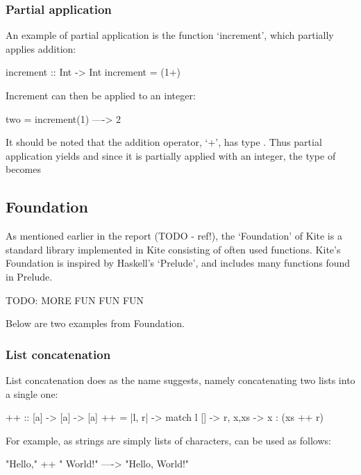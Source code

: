 \subsubsection{Partial application}

An example of partial application is the function `increment', which partially applies addition:

\begin{kite}

increment :: Int -> Int
increment = (1+)

\end{kite}

Increment can then be applied to an integer:

\begin{kite}
  
  two = increment(1) ----> 2
\end{kite}


It should be noted that the addition operator, `+', has type . Thus partial application yields  and since it is partially applied with an integer, the type of  becomes 

\subsection{Foundation}

As mentioned earlier in the report (TODO - ref!), the `Foundation' of Kite is a standard library implemented in Kite consisting of often used functions. Kite's Foundation is inspired by Haskell's `Prelude', and includes many functions found in
Prelude. 

TODO: MORE FUN FUN FUN

Below are two examples from Foundation.
\subsubsection{List concatenation}

List concatenation does as the name suggests, namely concatenating two lists into a single one:
\begin{kite}

{++} :: [a] -> [a] -> [a]
{++} = |l, r| -> {
  match l {
    [] -> r,
    x,xs -> x : (xs ++ r)
  }
}
\end{kite}

For example, as strings are simply lists of characters, \code{++} can be used as follows:

\begin{kite}

"Hello," ++ " World!" ----> "Hello, World!"
\end{kite}

